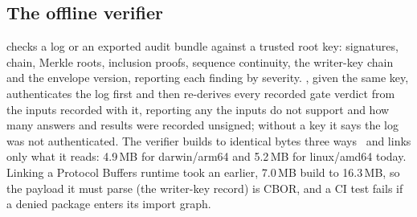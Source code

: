 \subsection{The offline verifier}
 checks a log or an exported audit bundle against a trusted
root key: signatures, chain, Merkle roots, inclusion proofs, sequence
continuity, the writer-key chain and the envelope version, reporting each
finding by severity. , given the same key, authenticates
the log first and then re-derives every recorded gate verdict from the inputs
recorded with it, reporting any the inputs do not support and how many answers
and results were recorded unsigned; without a key it says the log was not
authenticated. The verifier builds to identical bytes three
ways~\cite{reproduciblebuilds} and links only what it reads: 4.9\,MB for
darwin/arm64 and 5.2\,MB for linux/amd64 today. Linking a Protocol Buffers runtime took an
earlier, 7.0\,MB build to 16.3\,MB, so the payload it must parse (the
writer-key record) is CBOR, and a CI test fails if a denied package enters its
import graph.
